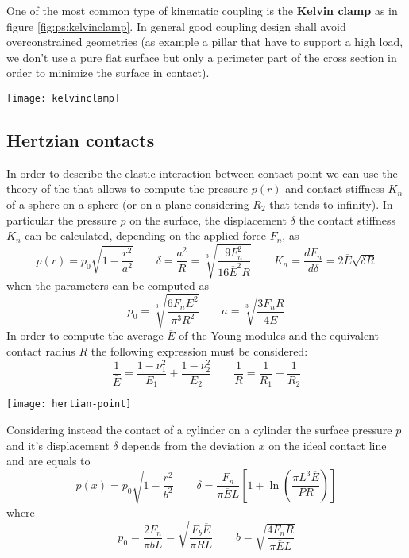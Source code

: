 		One of the most common type of kinematic coupling is the \textbf{Kelvin clamp} as in figure \ref{fig:ps:kelvinclamp}. In general good coupling design shall avoid overconstrained geometries (as example a pillar that have to support a high load, we don't use a pure flat surface but only a perimeter part of the cross section in order to minimize the surface in contact).
		
		\begin{SCfigure}[2][bht]
			\centering
			\texttt{[image: kelvinclamp]}
			\caption{Kelvin clamp of type I (on the left) and type II (right).} 
			\label{fig:ps:kelvinclamp}
		\end{SCfigure}
		
	\subsection{Hertzian contacts} 
		In order to describe the elastic interaction between contact point we can use the theory of the  that allows to compute the pressure $p(r)$ and contact stiffness $K_n$ of a sphere on a sphere (or on a plane considering $R_2$ that tends to infinity). In particular the pressure $p$ on the surface, the displacement $\delta$ the contact stiffness $K_n$ can be calculated, depending on the applied force $F_n$, as
		\begin{equation}
			p(r) = p_0 \sqrt{1- \frac{r^2}{a^2}} \qquad \delta = \frac{a^2}{R} = \sqrt[3]{ \frac{9F_n^2}{16\overline E^2 R} } \qquad K_n = \frac{dF_n}{d\delta} = 2\overline E \sqrt{\delta R}
		\end{equation}
		when the parameters can be computed as
		\[ p_0 = \sqrt[3]{\frac{6 F_n E^2}{\pi^3 R^2}} \qquad a = \sqrt[3]{\frac{3F_n R}{4\overline E}}  \]
		In order to compute the average $\overline E$ of the Young modules and the equivalent contact radius $R$ the following expression must be considered:
		\[\frac 1 {\overline E} = \frac{1-\nu_1^2}{E_1} + \frac{1-\nu_2^2}{E_2} \qquad \frac 1 R = \frac 1 {R_1} + \frac 1 {R_2}\]
		\begin{SCfigure}[3][bht]
			\centering
			\texttt{[image: hertian-point]}
			\caption{scheme to refer when considering the hertzian contact of a sphere on a sphere. On the left the macro picture of the contact with the main dimensions and on the left the heap map of the pressure distribution on the contact surface.}
		\end{SCfigure}
		
		Considering instead the contact of a cylinder on a cylinder the surface pressure $p$ and it's displacement $\delta$ depends from the deviation $x$ on the ideal contact line and are equals to
		\begin{equation}
			p(x) = p_0 \sqrt{1- \frac{r^2}{b^2}} \qquad \delta = \frac{F_n}{\pi \overline E L} \left[ 1 + \ln \left(\frac{\pi L^3\overline E}{PR}\right) \right]
		\end{equation}
		where
		\[ p_0 = \frac{2F_n}{\pi b L } = \sqrt{\frac{F_b\overline E}{\pi RL}} \qquad b = \sqrt{\frac{4F_nR}{\pi \overline E L}}  \]
		

